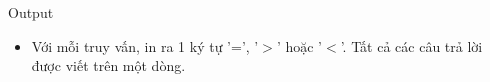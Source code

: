 Output  
\begin{itemize}
	\item     Với mỗi truy vấn, in ra 1 ký tự '=', '$>$' hoặc '$<$'. Tất cả các câu trả lời được viết trên một dòng.   
\end{itemize}